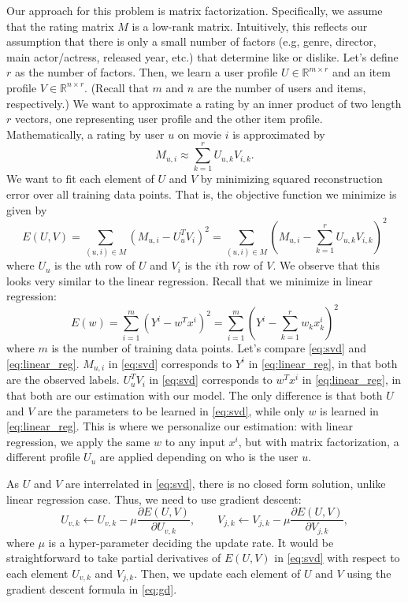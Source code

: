 \documentclass[12pt]{article}
\begin{document}
Our approach for this problem is matrix factorization. Specifically,
we assume that the rating matrix $M$ is a low-rank matrix.
Intuitively, this reflects our assumption that there is only a small
number of factors (e.g, genre, director, main actor/actress,
released year, etc.) that determine like or dislike. Let's define
$r$ as the number of factors. Then, we learn a user profile $U \in
\mathbb{R}^{m \times r}$ and an item profile $V \in \mathbb{R}^{n
\times r}$. (Recall that $m$ and $n$ are the number of users and
items, respectively.) We want to approximate a rating by an inner
product of two length $r$ vectors, one representing user profile and
the other item profile. Mathematically, a rating by user $u$ on
movie $i$ is approximated by
\begin{equation}
M_{u,i} \approx \sum_{k=1}^r U_{u,k} V_{i,k}.
\end{equation}
We want to fit each element of $U$ and $V$ by minimizing squared
reconstruction error over all training data points. That is, the
objective function we minimize is given by
\begin{equation}
E(U,V) = \sum_{(u, i) \in M} (M_{u,i} - U_u^T V_i)^2 = \sum_{(u, i)
\in M} (M_{u,i} - \sum_{k=1}^r U_{u,k} V_{i,k})^2 \label{eq:svd}
\end{equation}
where $U_u$ is the $u$th row of $U$ and $V_i$ is the $i$th row of
$V$. We observe that this looks very similar to the linear
regression. Recall that we minimize in linear regression:
\begin{equation}
E(w) = \sum_{i=1}^m (Y^i - w^T x^i)^2 = \sum_{i=1}^m (Y^i
- \sum_{k=1}^r w_k x^i_k)^2 \label{eq:linear_reg}
\end{equation}
where $m$ is the number of training data points. Let's compare
\eqref{eq:svd} and \eqref{eq:linear_reg}. $M_{u,i}$ in
\eqref{eq:svd} corresponds to $Y^i$ in \eqref{eq:linear_reg}, in
that both are the observed labels. $U_u^T V_i$ in \eqref{eq:svd}
corresponds to $w^T x^i$ in \eqref{eq:linear_reg}, in that both
are our estimation with our model. The only difference is that both
$U$ and $V$ are the parameters to be learned in \eqref{eq:svd},
while only $w$ is learned in \eqref{eq:linear_reg}. This is
where we personalize our estimation: with linear regression, we
apply the same $w$ to any input $x^i$, but with matrix
factorization, a different profile $U_u$ are applied depending on
who is the user $u$.

As $U$ and $V$ are interrelated in \eqref{eq:svd}, there is no
closed form solution, unlike linear regression case. Thus, we need
to use gradient descent:
\begin{equation}
U_{v,k} \gets U_{v,k} - \mu \frac{\partial E(U, V)}{\partial
U_{v,k}}, \quad \quad V_{j,k} \gets V_{j,k} - \mu \frac{\partial
E(U, V)}{\partial V_{j,k}},\label{eq:gd}
\end{equation}
where $\mu$ is a hyper-parameter deciding the update rate. It would
be straightforward to take partial derivatives of $E(U,V)$ in
\eqref{eq:svd} with respect to each element $U_{v,k}$ and $V_{j,k}$.
Then, we update each element of $U$ and $V$ using the gradient
descent formula in \eqref{eq:gd}.
\end{document}
